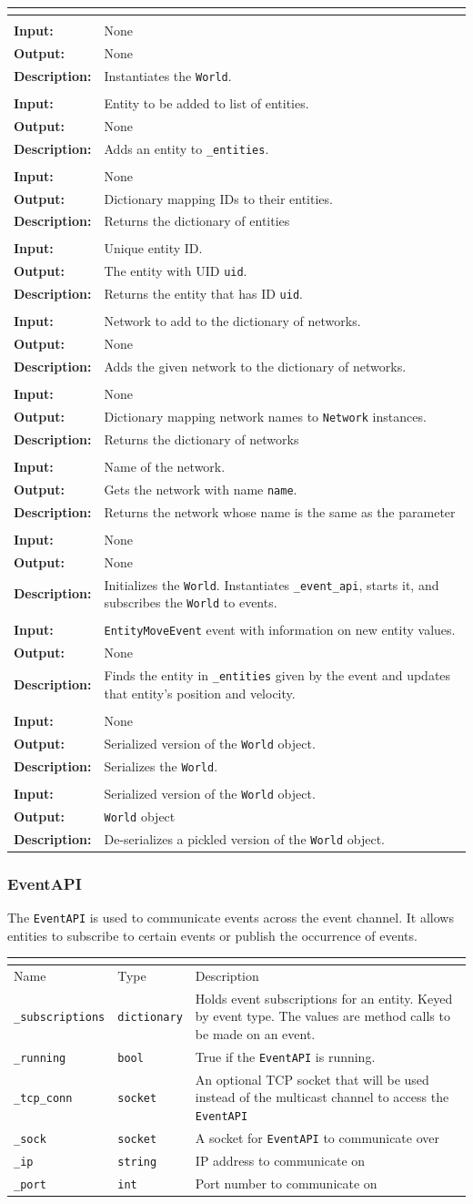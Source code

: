 \documentclass[titlepage]{article}
\newcommand{\operations}[1]{
\begin{center}
    \begin{longtable}{|p{4cm}|p{10cm + 2.0\tabcolsep}|}
    \hline
    \multicolumn{2}{|l|}{\cellcolor[gray]{0.5}{\textbf{Operations}}} \\ \hline
#1
    \end{longtable}
\end{center}
}
\newcommand{\operation}[4]{
    \hline
    \multicolumn{2}{|l|}{\cellcolor[gray]{0.8}{\texttt{#1}}} \\ \hline
    \hspace{7pt}\textbf{Input:} & #2 \\ \hline
    \hspace{7pt}\textbf{Output:} & #3 \\ \hline
    \hspace{7pt}\textbf{Description:} & #4 \\ \hline
}
\newcommand{\attributes}[1]{
    \begin{center}
        \begin{tabular}{|p{3.5cm}|p{3.5cm}|p{7cm}|}
            \multicolumn{3}{|l|}{\cellcolor[gray]{0.5}{\textbf{Attributes}}} \\ \hline
            \rowcolor[gray]{0.8} Name & Type & Description \\ \hline 
            #1
        \end{tabular}
    \end{center}
}
\newcommand{\attribute}[3]{
    \texttt{#1} & \texttt{#2} & #3 \\ \hline
}
\begin{document}
\operations{
    \operation{\_\_init\_\_()}{None}{None}{Instantiates the \texttt{World}.}
    \operation{add\_entity(entity)}{Entity to be added to list of entities.}{None}{Adds an entity to \texttt{\_entities}.}
    \operation{get\_entities()}{None}{Dictionary mapping IDs to their entities.}{Returns the dictionary of entities}
    \operation{get\_entity(uid)}{Unique entity ID.}{The entity with UID \texttt{uid}.}{Returns the entity that has ID \texttt{uid}.}
    \operation{add\_network(network)}{Network to add to the dictionary of networks.}{None}{Adds the given network to the dictionary of networks. }
    \operation{get\_networks()}{None}{Dictionary mapping network names to \texttt{Network} instances.}{Returns the dictionary of networks}
    \operation{get\_network(name)}{Name of the network.}{Gets the network with name \texttt{name}.}{Returns the network whose name is the same as the parameter}
    \operation{initialize()}{None}{None}{Initializes the \texttt{World}. Instantiates \texttt{\_event\_api}, starts it, and subscribes the \texttt{World} to events.}
    \operation{\_on\_entity\_move(event)}{\texttt{EntityMoveEvent} event with information on new entity values.}{None}{Finds the entity in \texttt{\_entities} given by the event and updates that entity's position and velocity.}
    \operation{pickle()}{None}{Serialized version of the \texttt{World} object.}{Serializes the \texttt{World}.}
    \operation{from\_pickle(pickled)}{Serialized version of the \texttt{World} object.}{\texttt{World} object}{De-serializes a pickled version of the \texttt{World} object.}
}
    
\subsubsection{EventAPI}
{The \texttt{EventAPI} is used to communicate events across the event channel. It allows entities to subscribe to certain events or publish the occurrence of events.}

\attributes{
    \attribute{\_subscriptions}{dictionary}{Holds event subscriptions for an entity. Keyed by event type. The values are method calls to be made on an event.}
    \attribute{\_running}{bool}{True if the \texttt{EventAPI} is running.}
    \attribute{\_tcp\_conn}{socket}{An optional TCP socket that will be used instead of the multicast channel to access the \texttt{EventAPI}}
    \attribute{\_sock}{socket}{A socket for \texttt{EventAPI} to communicate over}
    \attribute{\_ip}{string}{IP address to communicate on}
    \attribute{\_port}{int}{Port number to communicate on}
}
\end{document}
